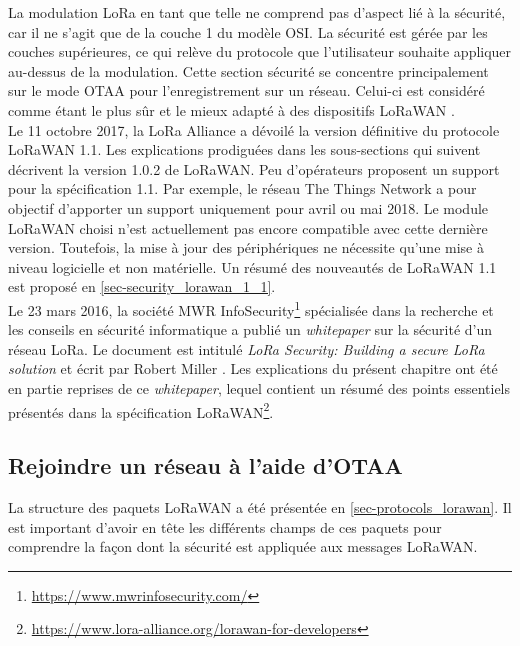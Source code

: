 
La modulation LoRa en tant que telle ne comprend pas d'aspect lié à la sécurité, car il ne s'agit que de la couche 1 du modèle OSI. La sécurité est gérée par les couches supérieures, ce qui relève du protocole que l'utilisateur souhaite appliquer au-dessus de la modulation. Cette section sécurité se concentre principalement sur le mode OTAA pour l'enregistrement sur un réseau. Celui-ci est considéré comme étant le plus sûr et le mieux adapté à des dispositifs LoRaWAN \cite{ttnvideos_security:online}\cite{LoRaSecu3:online}.\\


Le 11 octobre 2017, la LoRa Alliance a dévoilé la version définitive du protocole LoRaWAN 1.1. Les explications prodiguées dans les sous-sections qui suivent décrivent la version 1.0.2 de LoRaWAN. Peu d'opérateurs proposent un support pour la spécification 1.1. Par exemple, le réseau The Things Network a pour objectif d'apporter un support uniquement pour avril ou mai 2018. Le module LoRaWAN choisi n'est actuellement pas encore compatible avec cette dernière version. Toutefois, la mise à jour des périphériques ne nécessite qu'une mise à niveau logicielle et non matérielle. Un résumé des nouveautés de LoRaWAN 1.1 est proposé en \cref{sec-security_lorawan_1_1}.\\


Le 23 mars 2016, la société MWR InfoSecurity\footnote{\url{https://www.mwrinfosecurity.com/}} spécialisée dans la recherche et les conseils en sécurité informatique a publié un \textit{whitepaper} sur la sécurité d'un réseau LoRa. Le document est intitulé \textit{LoRa Security: Building a secure LoRa solution} et écrit par Robert Miller \cite{LoRaSecu3:online}. Les explications du présent chapitre ont été en partie reprises de ce \textit{whitepaper}, lequel contient un résumé des points essentiels présentés dans la spécification LoRaWAN\footnote{\url{https://www.lora-alliance.org/lorawan-for-developers}}.


\subsection{Rejoindre un réseau à l'aide d'OTAA}
\label{sec-security_lorawan_join}


La structure des paquets LoRaWAN a été présentée en \cref{sec-protocols_lorawan}. Il est important d'avoir en tête les différents champs de ces paquets pour comprendre la façon dont la sécurité est appliquée aux messages LoRaWAN.

